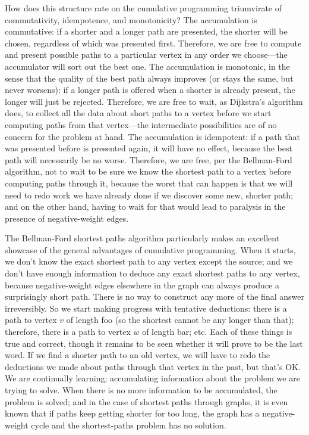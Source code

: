 \documentclass[12pt]{article}
\begin{document}
How does this structure rate on the cumulative programming triumvirate
of commutativity, idempotence, and monotonicity?  The accumulation is
commutative: if a shorter and a longer path are presented, the shorter
will be chosen, regardless of which was presented first.  Therefore,
we are free to compute and present possible paths to a particular
vertex in any order we choose---the accumulator will sort out the best
one.  The accumulation is monotonic, in the sense that the quality of
the best path always improves (or stays the same, but never worsens):
if a longer path is offered when a shorter is already present, the
longer will just be rejected.  Therefore, we are free to wait, as
Dijkstra's algorithm does, to collect all the data about short paths
to a vertex before we start computing paths from that vertex---the
intermediate possibilities are of no concern for the problem at hand.
The accumulation is idempotent: if a path that was presented before is
presented again, it will have no effect, because the best path will
necessarily be no worse.  Therefore, we are free, per the Bellman-Ford
algorithm, not to wait to be sure we know the shortest path to a
vertex before computing paths through it, because the worst that can
happen is that we will need to redo work we have already done if we
discover some new, shorter path; and on the other hand, having to wait
for that would lead to paralysis in the presence of negative-weight
edges.

The Bellman-Ford shortest paths algorithm particularly makes an
excellent showcase of the general advantages of cumulative
programming.  When it starts, we don't know the exact shortest path to
any vertex except the source; and we don't have enough information to
deduce any exact shortest paths to any vertex, because negative-weight
edges elsewhere in the graph can always produce a surprisingly short
path.  There is no way to construct any more of the final answer
irreversibly.  So we start making progress with tentative deductions:
there is a path to vertex $v$ of length foo (so the shortest cannot be
any longer than that); therefore, there is a path to vertex $w$ of
length bar; etc.  Each of these things is true and correct, though it
remains to be seen whether it will prove to be the last word.  If we
find a shorter path to an old vertex, we will have to redo the
deductions we made about paths through that vertex in the past, but
that's OK.  We are continually learning; accumulating information
about the problem we are trying to solve.  When there is no more
information to be accumulated, the problem is solved; and in the case
of shortest paths through graphs, it is even known that if paths keep
getting shorter for too long, the graph has a negative-weight cycle
and the shortest-paths problem has no solution.




\end{document}
